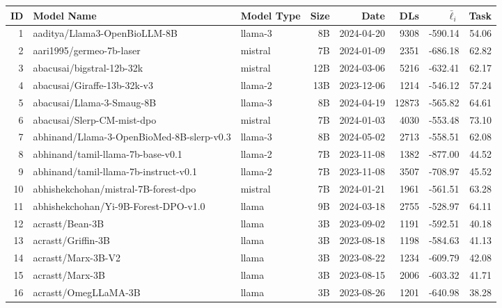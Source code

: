 {\begin{longtable}{r@{\hspace{1em}}l@{\hspace{1em}}l@{\hspace{1em}}r@{\hspace{1em}}r@{\hspace{1em}}r@{\hspace{1em}}r@{\hspace{1em}}r}
\toprule
ID & Model Name & Model Type & Size & Date & DLs & $\bar{\ell}_i$ & Task\\
\midrule
\endhead
1 & \parbox[t]{7.5cm}{aaditya/Llama3-OpenBioLLM-8B~\cite{arxiv:2212.13138,arxiv:2303.13375,arxiv:2305.09617,arxiv:2402.07023,OpenBioLLMs,arxiv:2305.18290}} & llama-3 & 8B & 2024-04-20 & 9308 & -590.14 & 54.06 \\
2 & \parbox[t]{7.5cm}{aari1995/germeo-7b-laser} & mistral & 7B & 2024-01-09 & 2351 & -686.18 & 62.82 \\
3 & \parbox[t]{7.5cm}{abacusai/bigstral-12b-32k} & mistral & 12B & 2024-03-06 & 5216 & -632.41 & 62.17 \\
4 & \parbox[t]{7.5cm}{abacusai/Giraffe-13b-32k-v3} & llama-2 & 13B & 2023-12-06 & 1214 & -546.12 & 57.24 \\
5 & \parbox[t]{7.5cm}{abacusai/Llama-3-Smaug-8B~\cite{arxiv:2402.13228}} & llama-3 & 8B & 2024-04-19 & 12873 & -565.82 & 64.61 \\
6 & \parbox[t]{7.5cm}{abacusai/Slerp-CM-mist-dpo} & mistral & 7B & 2024-01-03 & 4030 & -553.48 & 73.10 \\
7 & \parbox[t]{7.5cm}{abhinand/Llama-3-OpenBioMed-8B-slerp-v0.3} & llama-3 & 8B & 2024-05-02 & 2713 & -558.51 & 62.08 \\
8 & \parbox[t]{7.5cm}{abhinand/tamil-llama-7b-base-v0.1~\cite{arxiv:2311.05845}} & llama-2 & 7B & 2023-11-08 & 1382 & -877.00 & 44.52 \\
9 & \parbox[t]{7.5cm}{abhinand/tamil-llama-7b-instruct-v0.1~\cite{arxiv:2311.05845}} & llama-2 & 7B & 2023-11-08 & 3507 & -708.97 & 45.52 \\
10 & \parbox[t]{7.5cm}{abhishekchohan/mistral-7B-forest-dpo} & mistral & 7B & 2024-01-21 & 1961 & -561.51 & 63.28 \\
11 & \parbox[t]{7.5cm}{abhishekchohan/Yi-9B-Forest-DPO-v1.0} & llama & 9B & 2024-03-18 & 2755 & -528.97 & 64.11 \\
12 & \parbox[t]{7.5cm}{acrastt/Bean-3B} & llama & 3B & 2023-09-02 & 1191 & -592.51 & 40.18 \\
13 & \parbox[t]{7.5cm}{acrastt/Griffin-3B} & llama & 3B & 2023-08-18 & 1198 & -584.63 & 41.13 \\
14 & \parbox[t]{7.5cm}{acrastt/Marx-3B-V2} & llama & 3B & 2023-08-22 & 1234 & -609.79 & 42.08 \\
15 & \parbox[t]{7.5cm}{acrastt/Marx-3B} & llama & 3B & 2023-08-15 & 2006 & -603.32 & 41.71 \\
16 & \parbox[t]{7.5cm}{acrastt/OmegLLaMA-3B} & llama & 3B & 2023-08-26 & 1201 & -640.98 & 38.28 \\

\end{longtable}}
